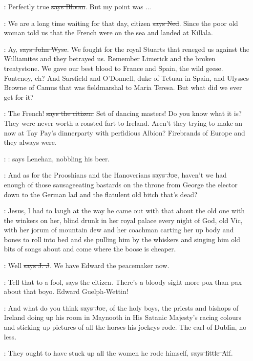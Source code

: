 \Bloom:
Perfectly true \sout{says Bloom}.
But my point was ...

\lambert:
We are a long time waiting for that day,
citizen \sout{says Ned}. Since the
poor old woman told us that the French were on the sea and landed at
Killala.

\johnwyse:
Ay, \sout{says John Wyse}.
We fought for the royal Stuarts that reneged us
against the Williamites and they betrayed us. Remember Limerick and the
broken treatystone. We gave our best blood to France and Spain, the wild
geese. Fontenoy, eh? And Sarsfield and O'Donnell, duke of Tetuan in
Spain, and Ulysses Browne of Camus that was fieldmarshal to Maria Teresa.
But what did we ever get for it?

\citizen:
The French! \sout{says the citizen.}
Set of dancing masters! Do you know what
it is? They were never worth a roasted fart to Ireland. Aren't they
trying to make an  now at Tay Pay's dinnerparty with
perfidious Albion? Firebrands of Europe and they always were.

\lenehan:
\Nq:
says Lenehan, nobbling his beer.

\joe:
And as for the Prooshians and the Hanoverians
\sout{says Joe}, haven't we had
enough of those sausageeating bastards on the throne from George the
elector down to the German lad and the flatulent old bitch that's dead?

\Nq:
Jesus, I had to laugh at the way he came out with that about the old one
with the winkers on her, blind drunk in her royal palace every night of
God, old Vic, with her jorum of mountain dew and her coachman carting her
up body and bones to roll into bed and she pulling him by the whiskers
and singing him old bits of songs about 
and come where the boose is cheaper.

\jjom:
Well \sout{says J. J}.
We have Edward the peacemaker now.

\citizen:
Tell that to a fool, \sout{says the citizen}.
There's a bloody sight more pox
than pax about that boyo. Edward Guelph-Wettin!

\joe:
And what do you think \sout{says Joe}, of the holy boys, the priests and
bishops of Ireland doing up his room in Maynooth in His Satanic Majesty's
racing colours and sticking up pictures of all the horses his jockeys
rode. The earl of Dublin, no less.

\bergan:
They ought to have stuck up all the women
he rode himself, \sout{says little
Alf}.

